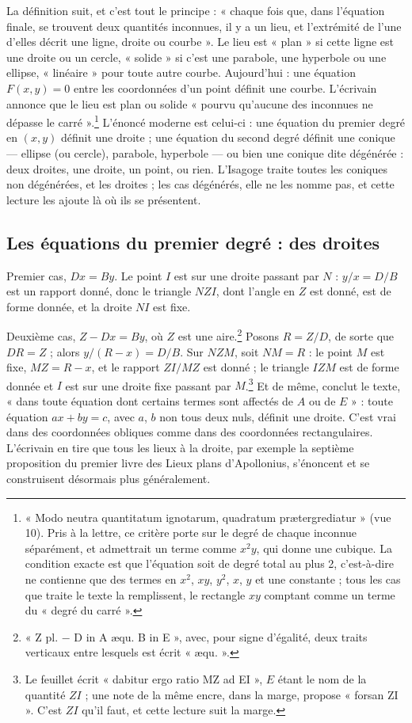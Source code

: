 \documentclass[11pt,a4paper]{article}
\begin{document}
La définition suit, et c'est tout le principe : « chaque fois que, dans
l'équation finale, se trouvent deux quantités inconnues, il y a un lieu, et
l'extrémité de l'une d'elles décrit une ligne, droite ou courbe ». Le lieu est
« plan » si cette ligne est une droite ou un cercle, « solide » si c'est une
parabole, une hyperbole ou une ellipse, « linéaire » pour toute autre courbe.
Aujourd'hui : une équation $F(x,y)=0$ entre les coordonnées d'un point définit
une courbe. L'écrivain annonce que le lieu est plan ou solide « pourvu
qu'aucune des inconnues ne dépasse le carré ».\footnote{« Modo neutra
quantitatum ignotarum, quadratum prætergrediatur » (vue 10). Pris à la lettre,
ce critère porte sur le degré de chaque inconnue séparément, et admettrait un
terme comme $x^2y$, qui donne une cubique. La condition exacte est que
l'équation soit de degré total au plus 2, c'est-à-dire ne contienne que des
termes en $x^2$, $xy$, $y^2$, $x$, $y$ et une constante ; tous les cas que
traite le texte la remplissent, le rectangle $xy$ comptant comme un terme du
« degré du carré ».} L'énoncé moderne est celui-ci : une équation du premier
degré en $(x,y)$ définit une droite ; une équation du second degré définit une
conique — ellipse (ou cercle), parabole, hyperbole — ou bien une conique dite
dégénérée : deux droites, une droite, un point, ou rien. L'Isagoge traite
toutes les coniques non dégénérées, et les droites ; les cas dégénérés, elle ne
les nomme pas, et cette lecture les ajoute là où ils se présentent.

\subsection*{Les équations du premier degré : des droites}

Premier cas, $Dx = By$. Le point $I$ est sur une droite passant par $N$ :
$y/x = D/B$ est un rapport donné, donc le triangle $NZI$, dont l'angle en $Z$
est donné, est de forme donnée, et la droite $NI$ est fixe.

Deuxième cas, $Z - Dx = By$, où $Z$ est une aire.\footnote{« Z pl. $-$ D in A
æqu. B in E », avec, pour signe d'égalité, deux traits verticaux entre lesquels
est écrit « æqu. ».} Posons $R = Z/D$, de sorte que $DR = Z$ ; alors
$y/(R-x) = D/B$. Sur $NZM$, soit $NM = R$ : le point $M$ est fixe, $MZ = R - x$,
et le rapport $ZI/MZ$ est donné ; le triangle $IZM$ est de forme donnée et $I$
est sur une droite fixe passant par $M$.\footnote{Le feuillet écrit « dabitur
ergo ratio MZ ad EI », $E$ étant le nom de la quantité $ZI$ ; une note de la
même encre, dans la marge, propose « forsan ZI ». C'est $ZI$ qu'il faut, et
cette lecture suit la marge.} Et de même, conclut le texte, « dans toute
équation dont certains termes sont affectés de $A$ ou de $E$ » : toute équation
$ax + by = c$, avec $a$, $b$ non tous deux nuls, définit une droite. C'est vrai
dans des coordonnées obliques comme dans des coordonnées rectangulaires.
L'écrivain en tire que tous les lieux à la droite, par exemple la septième
proposition du premier livre des Lieux plans d'Apollonius, s'énoncent et se
construisent désormais plus généralement.
\end{document}
